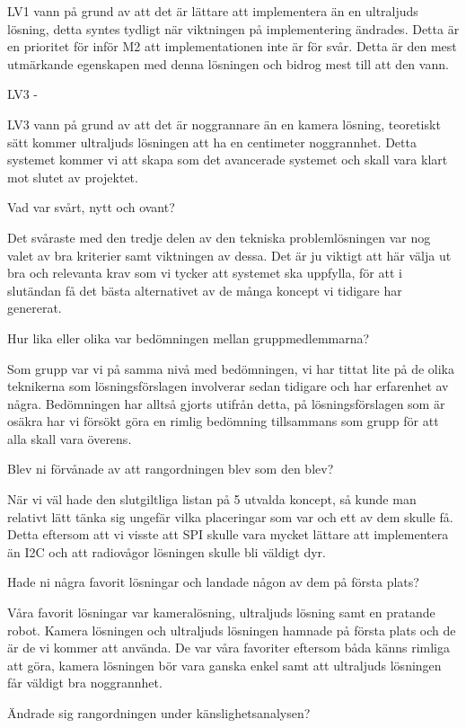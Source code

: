 \documentclass[11pt, a4paper]{report}
\begin{document}
LV1 vann på grund av att det är lättare att implementera än en ultraljuds lösning, detta syntes tydligt när viktningen på implementering ändrades. Detta är en prioritet för inför M2 att implementationen inte är för svår. Detta är den mest utmärkande egenskapen med denna lösningen och bidrog mest till att den vann. 

LV3 -

LV3 vann på grund av att det är noggrannare än en kamera lösning, teoretiskt sätt kommer ultraljuds lösningen att ha en centimeter noggrannhet. Detta systemet kommer vi att skapa som det avancerade systemet och skall vara klart mot slutet av projektet.



Vad var svårt, nytt och ovant?

Det svåraste med den tredje delen av den tekniska problemlösningen var nog valet av bra kriterier samt viktningen av dessa. Det är ju viktigt att här välja ut bra och relevanta krav som vi tycker att systemet ska uppfylla, för att i slutändan få det bästa alternativet av de många koncept vi tidigare har genererat.


Hur lika eller olika var bedömningen mellan gruppmedlemmarna?

Som grupp var vi på samma nivå med bedömningen, vi har tittat lite på de olika teknikerna som lösningsförslagen involverar sedan tidigare och har erfarenhet av några. Bedömningen har alltså gjorts utifrån detta, på lösningsförslagen som är osäkra har vi försökt göra en rimlig bedömning tillsammans som grupp för att alla skall vara överens.

Blev ni förvånade av att rangordningen blev som den blev?

När vi väl hade den slutgiltliga listan på 5 utvalda koncept, så kunde man relativt lätt tänka sig ungefär vilka placeringar som var och ett av dem skulle få. Detta eftersom att vi visste att SPI skulle vara mycket lättare att implementera än I2C och att radiovågor lösningen skulle bli väldigt dyr.

Hade ni några favorit lösningar och landade någon av dem på första plats?

Våra favorit lösningar var kameralösning, ultraljuds lösning samt en pratande robot. Kamera lösningen och ultraljuds lösningen hamnade på första plats och de är de vi kommer att använda. De var våra favoriter eftersom båda känns rimliga att göra, kamera lösningen bör vara ganska enkel samt att ultraljuds lösningen får väldigt bra noggrannhet.

Ändrade sig rangordningen under känslighetsanalysen?
\end{document}
